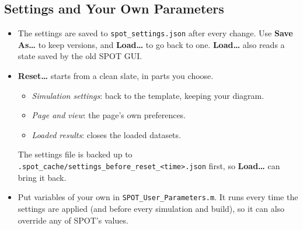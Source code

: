 \documentclass[11pt,a4paper]{article}
\newcommand{\ui}[1]{\textsf{\textbf{#1}}}
\newcommand{\pth}[1]{\texttt{#1}}
\begin{document}
\subsection{Settings and Your Own Parameters}\label{sec:settings}
\begin{itemize}
  \item The settings are saved to \pth{spot\_settings.json} after every change. Use \ui{Save As\ldots} to keep
        versions, and \ui{Load\ldots} to go back to one. \ui{Load\ldots} also reads a state saved by the old SPOT GUI.
  \item \ui{Reset\ldots} starts from a clean slate, in parts you choose.
        \begin{itemize}
          \item \emph{Simulation settings}: back to the template, keeping your diagram.
          \item \emph{Page and view}: the page's own preferences.
          \item \emph{Loaded results}: closes the loaded datasets.
        \end{itemize}
        The settings file is backed up to \pth{.spot\_cache/settings\_before\_reset\_<time>.json} first, so
        \ui{Load\ldots} can bring it back.
  \item Put variables of your own in \pth{SPOT\_User\_Parameters.m}. It runs every time the settings are applied
        (and before every simulation and build), so it can also override any of SPOT's values.
\end{itemize}
\end{document}
